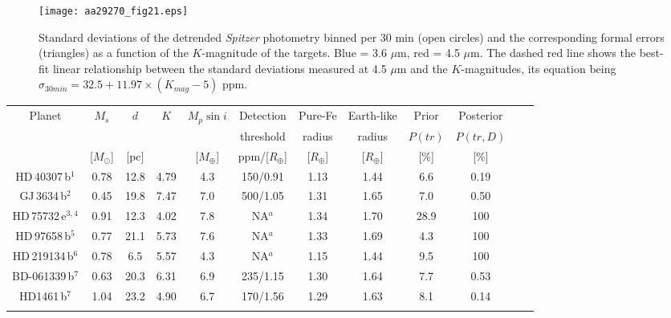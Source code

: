 \documentclass[traditabstract]{aa}
\begin{document}
 \begin{figure}
\label{fig:21}
\centering                     
\texttt{[image: aa29270\_fig21.eps]}
\caption{Standard deviations of the detrended {\it Spitzer} photometry binned per 30 min (open circles) and the corresponding formal errors (triangles) as a function of the $K$-magnitude of the targets.  Blue  = 3.6 $\mu$m,  red = 4.5 $\mu$m. The dashed red line shows the best-fit linear relationship between the standard deviations measured at 4.5 $\mu$m and the $K$-magnitudes, its equation being $\sigma_{30min} =  32.5 + 11.97\times(K_{mag} - 5)$ ppm. }
\end{figure} 

\begin{table*}
\begin{center}
\label{tab:rvsmallplanets}
\begin{tabular}{cccccccccccc}
\hline\noalign {\smallskip}
Planet    &        $M_s$   &   $d$  & $K$    &  $M_p \sin{i} $  & Detection & Pure-Fe & Earth-like & Prior  & Posterior \\ \noalign {\smallskip}
               &                    &              &           &                            &   threshold & radius  & radius & $P(tr)$  & $P(tr,D)$\\ \noalign {\smallskip}
               & [$M_\odot$]   &   [pc]   &           &     [$M_\oplus$]    &  ppm/[$R_\oplus$] & [$R_\oplus$] &  [$R_\oplus$]  &   [\%]                       &     [\%]   \\ \noalign {\smallskip}
\hline \noalign {\smallskip}
HD\,40307\,b$^{1}$ & 0.78 & 12.8 & 4.79 & 4.3 & 150/0.91 & 1.13 & 1.44 &  6.6 & 0.19  \\ \noalign {\smallskip}
GJ\,3634\,b$^{2}$    & 0.45 & 19.8   & 7.47 & 7.0 & 500/1.05 & 1.31 & 1.65 & 7.0 & 0.50 \\ \noalign {\smallskip}
HD\,75732\,e$^{3, 4}$  & 0.91 & 12.3 & 4.02 &    7.8   & NA$^{a}$ & 1.34 & 1.70 &   28.9 & 100  \\ \noalign {\smallskip}
HD\,97658\,b$^{5}$ & 0.77 &  21.1 & 5.73  &  7.6 & NA$^{a}$ & 1.33 & 1.69 &  4.3  & 100 \\ \noalign {\smallskip}
HD\,219134\,b$^{6}$ & 0.78 & 6.5 & 5.57 & 4.3 & NA$^{a}$ &  1.15 & 1.44  & 9.5 & 100  \\ \noalign {\smallskip}
\hline \noalign {\smallskip}
BD-061339\,b$^{7}$ & 0.63 & 20.3  & 6.31 & 6.9 &  235/1.15 & 1.30 & 1.64 & 7.7 &  0.53 \\ \noalign {\smallskip}
HD1461\,b$^{7}$      & 1.04 & 23.2  & 4.90 & 6.7 &  170/1.56 & 1.29 & 1.63 & 8.1 &  0.14 \\ \noalign {\smallskip}

\end{tabular}
\end{center}
\end{table*}
\end{document}
